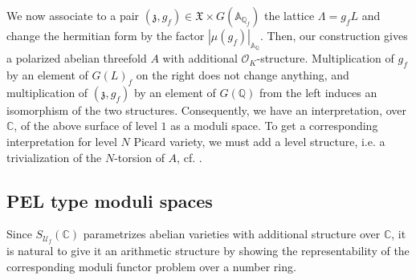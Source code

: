 \documentclass[12pt,a4paper,reqno]{amsart}
\theoremstyle{definition}
\numberwithin{definition}{subsection}
\theoremstyle{definition}
\numberwithin{Definition}{subsection}
\theoremstyle{remark}
\theoremstyle{remark}
\numberwithin{Remark}{subsection}
\theoremstyle{remark}
\theoremstyle{plain}
\numberwithin{Theorem}{subsection}
\theoremstyle{plain}
\theoremstyle{plain}
\theoremstyle{plain}
\theoremstyle{plain}
\theoremstyle{plain}
\theoremstyle{plain}
\theoremstyle{plain}
\newcommand*{\Q}{\mathbb{Q}}
\newcommand*{\Cc}{\mathbb{C}}
\newcommand*{\A}{\mathbb{A}}
\begin{document}
We now associate to a pair $(\mathfrak{z},g_f)\in \mathfrak{X}\times G(\A_{\Q_f})$ the lattice $\Lambda=g_fL$ and change the hermitian form by the factor $|\mu(g_f)|_{\A_{\Q}}$. Then, our construction gives a polarized abelian threefold $A$ with additional $\mathcal{O}_K$-structure. Multiplication of $g_f$ by an element of $G(L)_f$ on the right does not change anything, and multiplication of $(\mathfrak{z}, g_f)$ by an element of $G(\Q)$ from the left induces an isomorphism of the two structures. Consequently, we have an interpretation, over $\Cc$, of the above surface of level $1$ as a moduli space. To get a corresponding interpretation for level $N$ Picard variety, we must add a level structure, i.e. a trivialization of the $N$-torsion of $A$, cf. \cite[p. 11]{goren}.
\subsection{PEL type moduli spaces}
Since $S_{\mathcal{U}_f}(\Cc)$ parametrizes abelian varieties with additional structure over $\Cc$, it is natural to give it an arithmetic structure by showing the representability of the corresponding moduli functor problem over a number ring.
\end{document}
